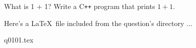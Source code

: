 What is 1 + 1?
Write a C\texttt{++} program that prints $1 + 1$.

Here's a \LaTeX\ file included from the question's directory ...

{q0101.tex}
